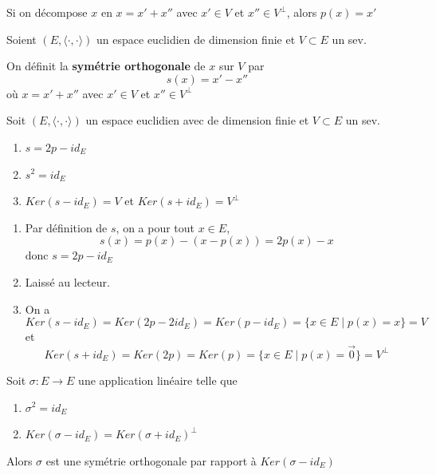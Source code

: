 \documentclass[a4paper, 12pt]{article}
\begin{document}
\begin{remarque}
    Si on décompose $x$ en $x = x' + x''$ avec $x' \in V$ et $x'' \in V^\perp$, alors $p(x) = x'$
\end{remarque}

\begin{definition}
    Soient $(E, \langle \cdot, \cdot \rangle)$ un espace euclidien de dimension finie et $V \subset E$ un sev.

    On définit la \textbf{symétrie orthogonale} de $x$ sur $V$ par
    $$
    s(x) = x' - x''
    $$
    où $x = x' + x''$ avec $x' \in V$ et $x'' \in V^\perp$
\end{definition}

\begin{proposition}{}{}
    Soit $(E, \langle \cdot, \cdot \rangle)$ un espace euclidien avec de dimension finie et $V \subset E$ un sev.

    \begin{enumerate}
        \item $s = 2p - id_E$
        \item $s^2 = id_E$
        \item $Ker(s - id_E) = V$ et $Ker(s + id_E) = V^\perp$
    \end{enumerate}
\end{proposition}

\begin{demonstration}
    \begin{enumerate}
        \item Par définition de $s$, on a pour tout $x \in E$,
        $$
        s(x) = p(x) - (x - p(x)) = 2p(x) - x
        $$
        donc $s = 2p - id_E$
        \item Laissé au lecteur.
        \item On a
        $$
        Ker(s - id_E) = Ker(2p - 2id_E) = Ker(p - id_E) = \{x \in E \mid p(x) = x\} = V
        $$
        et
        $$
        Ker(s + id_E) = Ker(2p) = Ker(p) = \{x \in E \mid p(x) = \vec{0}\} = V^\perp
        $$
    \end{enumerate}
\end{demonstration}

\begin{proposition}{}{}
    Soit $\sigma: E \to E$ une application linéaire telle que
    \begin{enumerate}
        \item $\sigma^2 = id_E$
        \item $Ker(\sigma - id_E) = Ker(\sigma + id_E)^\perp$
    \end{enumerate}
    Alors $\sigma$ est une symétrie orthogonale par rapport à $Ker(\sigma - id_E)$
\end{proposition}
\end{document}

